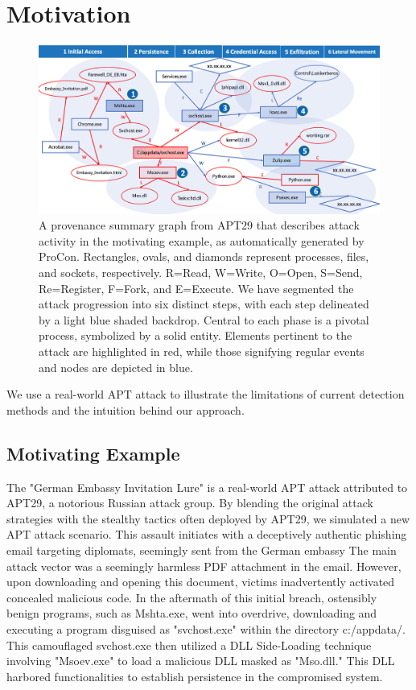 \section{Motivation}

\begin{figure}[h]
    \centering
      \includegraphics[width=1\textwidth]{figs/example.jpg}
    \caption{A provenance summary graph from APT29 that describes attack activity in the motivating example, as automatically generated by ProCon. Rectangles, ovals, and diamonds represent processes, files, and sockets, respectively. R=Read, W=Write, O=Open, S=Send, Re=Register, F=Fork, and E=Execute. We have segmented the attack progression into six distinct steps, with each step delineated by a light blue shaded backdrop. Central to each phase is a pivotal process, symbolized by a solid entity. Elements pertinent to the attack are highlighted in red, while those signifying regular events and nodes are depicted in blue.}
    \label{fig-example} 
    \end{figure}

We use a real-world APT attack to illustrate the limitations of current detection methods and the intuition behind our approach.
\subsection{Motivating Example}
The "German Embassy Invitation Lure" is a real-world APT attack attributed to APT29, a notorious Russian attack group. By blending the original attack strategies with the stealthy tactics often deployed by APT29, we simulated a new APT attack scenario. This assault initiates with a deceptively authentic phishing email targeting diplomats, seemingly sent from the German embassy
The main attack vector was a seemingly harmless PDF attachment in the email. However, upon downloading and opening this document, victims inadvertently activated concealed malicious code.
In the aftermath of this initial breach, ostensibly benign programs, such as Mshta.exe, went into overdrive, downloading and executing a program disguised as "svchost.exe" within the directory c:/appdata/. This camouflaged svchost.exe then utilized a DLL Side-Loading technique involving "Msoev.exe" to load a malicious DLL masked as "Mso.dll." This DLL harbored functionalities to establish persistence in the compromised system.

